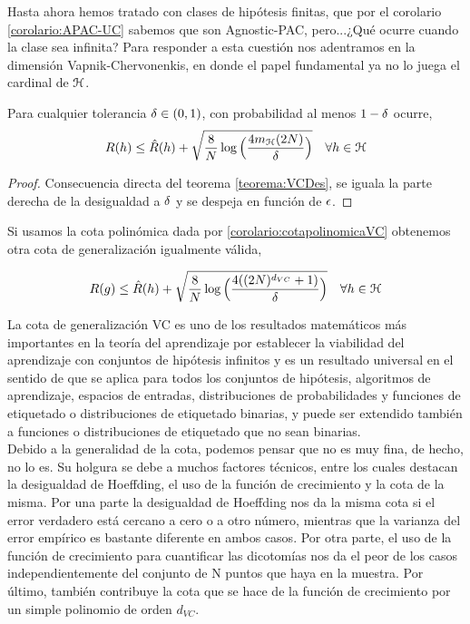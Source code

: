     Hasta ahora hemos tratado con clases de hipótesis finitas, que por el corolario \ref{corolario:APAC-UC} sabemos que son Agnostic-PAC, pero...¿Qué ocurre cuando la clase sea infinita? Para responder a esta cuestión nos adentramos en la dimensión Vapnik-Chervonenkis, en donde el papel fundamental ya no lo juega el cardinal de $\mathcal{H}$.
    
    \begin{teorema}\label{teorema:cotaVC}
    Para cualquier tolerancia $\delta \in (0,1)$, con probabilidad al menos $1-\delta$ ocurre,
    \begin{equation}
        R(h) \leq \hat{R}(h) + \sqrt{\frac{8}{N}\log\Big(\frac{4m_{\mathcal{H}}(2N)}{\delta}\Big)} \quad \forall h \in \mathcal{H}
    \end{equation}
    \end{teorema}
    
    \begin{proof}
    Consecuencia directa del teorema \ref{teorema:VCDes}, se iguala la parte derecha de la desigualdad a $\delta$ y se despeja en función de $\epsilon$.
    \end{proof}
    
    Si usamos la cota polinómica dada por \ref{corolario:cotapolinomicaVC} obtenemos otra cota de generalización igualmente válida,
    
    \begin{equation}\label{eq:cota VC 2}
    R(g) \leq \hat{R}(h) + \sqrt{\frac{8}{N} \log \Big( \frac{4((2N)^{d_{VC}} + 1)}{\delta} \Big)}  \quad \forall h \in \mathcal{H}
    \end{equation}
    
    La cota de generalización VC es uno de los resultados matemáticos más importantes en la teoría del aprendizaje por establecer la viabilidad del aprendizaje con conjuntos de hipótesis infinitos y es un resultado universal en el sentido de que se aplica para todos los conjuntos de hipótesis, algoritmos de aprendizaje, espacios de entradas, distribuciones de probabilidades y funciones de etiquetado o distribuciones de etiquetado binarias, y puede ser extendido también a funciones o distribuciones de etiquetado que no sean binarias.\\
    
    Debido a la generalidad de la cota, podemos pensar que no es muy fina, de hecho, no lo es. Su holgura se debe a muchos factores técnicos, entre los cuales destacan la desigualdad de Hoeffding, el uso de la función de crecimiento y la cota de la misma. Por una parte la desigualdad de Hoeffding nos da la misma cota si el error verdadero está cercano a cero o a otro número, mientras que la varianza del error empírico es bastante diferente en ambos casos. Por otra parte, el uso de la función de crecimiento para cuantificar las dicotomías nos da el peor de los casos independientemente del conjunto de N puntos que haya en la muestra. Por último, también contribuye la cota que se hace de la función de crecimiento por un simple polinomio de orden $d_{VC}$. \\
    
